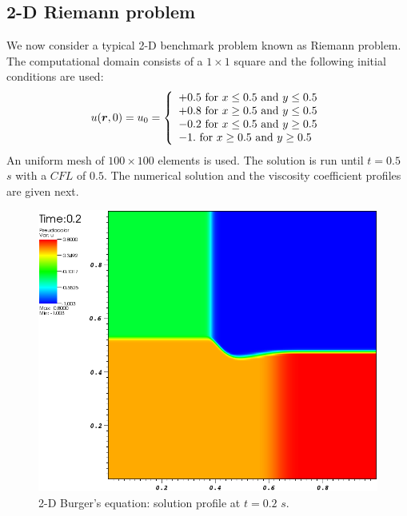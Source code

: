 \subsection{2-D Riemann problem}\label{sec:2dnum_sct2b}
We now consider a typical 2-D benchmark problem known as Riemann problem. The computational domain consists of a $1 \times 1$ square and the following initial conditions are used:
%
\begin{equation}\label{eq:bg_2d_ic_sct2b}
u(\boldsymbol r,0) = u_0 = \left\{
\begin{array}{l}
+0.5 \text{ for } x \leq 0.5 \text{ and } y \leq 0.5 \\
+0.8 \text{ for } x \geq 0.5 \text{ and } y \leq 0.5 \\
-0.2 \text{ for } x \leq 0.5 \text{ and } y \geq 0.5 \\
-1. \text{ for } x \geq 0.5 \text{ and } y \geq 0.5
\end{array}
\nonumber
\right.
\end{equation}
%
An uniform mesh of $100 \times 100$ elements is used. The solution is run until $t=0.5$ $s$ with a $CFL$ of $0.5$. The numerical solution and the viscosity coefficient profiles are given next. 
%
\begin{figure}[H]
	\centering
	\includegraphics[width=\textwidth]{figures/Burger2D_sol_t0p2.png}
	\caption{2-D Burger's equation: solution profile at $t=0.2$ $s$.}
	\label{fig:2d_burger_sol_t0p2}
\end{figure}
